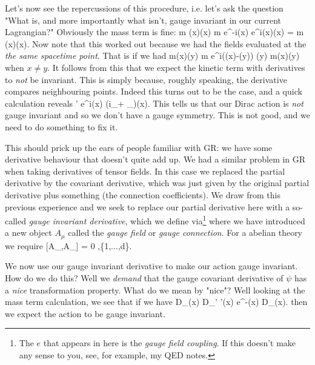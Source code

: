 Let's now see the repercussions of this procedure, i.e. let's ask the question "What is, and more importantly what isn't, gauge invariant in our current Lagrangian?" Obviously the mass term is fine:
\bse 
    m\overline{\psi} (x)\psi(x) \to m \overline{\psi} e^{-i\Lambda(x)} e^{i\Lambda(x)}\psi(x) = m \overline{\psi}(x)\psi(x).
\ese 
Now note that this worked out because we had the fields evaluated at the \textit{the same spacetime point}. That is if we had 
\bse 
    m\overline{\psi}(x)\psi(y) \to m\overline{\psi} e^{i(\Lambda(x)-\Lambda(y))} \psi(y) \neq m\overline{\psi}(x)\psi(y)
\ese 
when $x\neq y$. It follows from this that we expect the kinetic term with derivatives to \textit{not} be invariant. This is simply because, roughly speaking, the derivative compares neighbouring points. Indeed this turns out to be the case, and a quick calculation reveals
\bse 
    \p\psi' \to e^{i\Lambda(x)} \big(i\p_{\mu}\Lambda + \p_{\mu}\big)\psi(x). 
\ese
This tells us that our Dirac action is \textit{not} gauge invariant and so we don't have a gauge symmetry. This is not good, and we need to do something to fix it. 

This should prick up the ears of people familiar with GR: we have some derivative behaviour that doesn't quite add up. We had a similar problem in GR when taking derivatives of tensor fields. In this case we replaced the partial derivative by the covariant derivative, which was just given by the original partial derivative plus something (the connection coefficients). We draw from this previous experience and we seek to replace our partial derivative here with a so-called \textit{gauge invariant derivative}, which we define via\footnote{The $e$ that appears in here is the \textit{gauge field coupling}. If this doesn't make any sense to you, see, for example, my QED notes.}
\noindent where we have introduced a new object $A_{\mu}$ called the \textit{gauge field} or \textit{gauge connection}. For a abelian theory we require 
\be 
\label{eqn:Abelian}
    [A_{\mu},A_{\nu}] = 0 \qquad \forall \mu,\nu \in \{1,...,d\}. 
\ee 

We now use our gauge invariant derivative to make our action gauge invariant. How do we do this? Well we \textit{demand} that the gauge covariant derivative of $\psi$ has a \textit{nice} transformation property. What do we mean by "nice"? Well looking at the mass term calculation, we see that if we have 
\bse 
    D_{\mu}\psi(x) \to D_{\mu}' \psi'(x) \overset{!}{=} e^{-\Lambda(x)} D_{\mu}\psi(x). 
\ese 
then we expect the action to be gauge invariant. 

